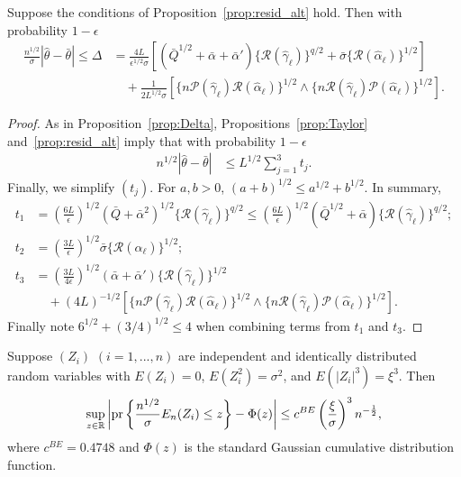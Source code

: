 \begin{proposition}\label{prop:Delta_alt}
Suppose the conditions of Proposition~\ref{prop:resid_alt} hold. Then with probability $1-\epsilon$
\begin{align*}
    \frac{n^{1/2}}{\sigma}|\hat{\theta}-\bar{\theta}|\leq 
\Delta&= \frac{4 L}{\epsilon^{1/2}  \sigma}\left[(\bar{Q}^{1/2}+\bar{\alpha}+\bar{\alpha}')\{\mathcal{R}(\hat{\gamma}_{\ell})\}^{q/2}+\bar{\sigma}\{\mathcal{R}(\hat{\alpha}_{\ell})\}^{1/2}\right]\\
&\quad +\frac{1}{2L^{1/2}\sigma}[\{n\mathcal{P}(\hat{\gamma}_{\ell})\mathcal{R}(\hat{\alpha}_{\ell})\}^{1/2} \wedge \{n\mathcal{R}(\hat{\gamma}_{\ell})\mathcal{P}(\hat{\alpha}_{\ell})\}^{1/2}].
\end{align*}
\end{proposition}

\begin{proof}
As in Proposition~\ref{prop:Delta}, Propositions~\ref{prop:Taylor} and~\ref{prop:resid_alt} imply that with probability $1-\epsilon$
\begin{align*}
 n^{1/2}|\hat{\theta}-\bar{\theta}|&\leq L^{1/2}\sum_{j=1}^3 t_j.
\end{align*}
Finally, we simplify $(t_j)$. For $a,b>0$, $(a+b)^{1/2}\leq a^{1/2}+b^{1/2}$. In summary,
\begin{align*}
    t_1&=\left(\frac{6L}{\epsilon}\right)^{1/2}(\bar{Q}+\bar{\alpha}^2)^{1/2}\{\mathcal{R}(\hat{\gamma}_{\ell})\}^{q/2}
    \leq \left(\frac{6L}{\epsilon}\right)^{1/2}(\bar{Q}^{1/2}+\bar{\alpha})\{\mathcal{R}(\hat{\gamma}_{\ell})\}^{q/2}; \\
    t_2&= \left(\frac{3L}{\epsilon}\right)^{1/2}\bar{\sigma}\{\mathcal{R}(\hat{\alpha}_{\ell})\}^{1/2};\\
    t_3&= \left(\frac{3L}{4\epsilon}\right)^{1/2}(\bar{\alpha}+\bar{\alpha}')\{\mathcal{R}(\hat{\gamma}_{\ell})\}^{1/2}\\
    &\quad  +(4L)^{-1/2} [\{n\mathcal{P}(\hat{\gamma}_{\ell})\mathcal{R}(\hat{\alpha}_{\ell})\}^{1/2} \wedge \{n\mathcal{R}(\hat{\gamma}_{\ell})\mathcal{P}(\hat{\alpha}_{\ell})\}^{1/2}].
\end{align*}
Finally note $6^{1/2}+(3/4)^{1/2}\leq 4$ when combining terms from $t_1$ and $t_3$.
\end{proof}

\begin{lemma}\label{lem:berry}
Suppose $(Z_i)$ $(i=1,...,n)$ are independent and identically distributed random variables with $E(Z_i)=0$, $E(Z_i^2)=\sigma^2$, and $E(|Z_i|^3)=\xi^3$. Then
$$
\sup_{z \in\mathbb{R}}\left|\text{\normalfont pr}\left\{\frac{n^{1/2}}{\sigma}E_n(Z_i)\leq z\right\}-\Phi(z)\right|\leq c^{BE} \left(\frac{\xi}{\sigma}\right)^3n^{-\frac{1}{2}},
$$
where $c^{BE}=0.4748$ and $\Phi(z)$ is the standard Gaussian cumulative distribution function.
\end{lemma}


